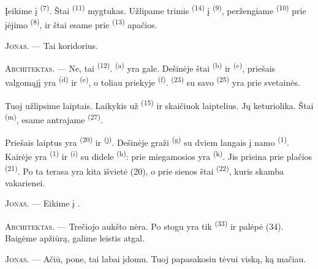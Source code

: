 Įeikime į  \textsuperscript{(7)}. Štai 
\textsuperscript{(11)} mygtukas. Užlipame trimis 
\textsuperscript{(14)} į  \textsuperscript{(9)}, peržengiame
 \textsuperscript{(10)} prie įėjimo 
\textsuperscript{(8)}, ir štai esame prie  \textsuperscript{(13)}
apačios.

\textsc{Jonas}. --- Tai koridorius.

\textsc{Architektas}. --- Ne, tai  \textsuperscript{(12)}.
 \textsuperscript{(a)} yra gale. Dešinėje štai 
\textsuperscript{(b)} ir  \textsuperscript{(c)}, priešais
valgomąjį yra  \textsuperscript{(d)} ir 
\textsuperscript{(e)}, o toliau priekyje 
\textsuperscript{(f)}.  \textsuperscript{(23)} su savo
 \textsuperscript{(25)} yra prie svetainės.

Tuoj užlipsime laiptais. Laikykis už  \textsuperscript{(15)} ir
skaičiuok laiptelius. Jų keturiolika. Štai 
\textsuperscript{(m)}, esame antrajame  \textsuperscript{(27)}.

\VUsaut{3.0mm}
\VUsaut{3.0mm}

Priešais laiptus yra  \textsuperscript{(20)} ir 
\textsuperscript{(j)}. Dešinėje graži  \textsuperscript{(g)} su
dviem langais į namo  \textsuperscript{(1)}. Kairėje yra
 \textsuperscript{(1)} ir 
\textsuperscript{(i)} su didele  \textsuperscript{(h)}: prie
miegamosios yra  \textsuperscript{(k)}. Jis prieina prie
plačios  \textsuperscript{(21)}. Po ta terasa yra kita išvietė (20),
o prie sienos štai  \textsuperscript{(22)}, kuris skamba vakarienei.

\textsc{Jonas}. --- Eikime į .

\textsc{Architektas}. --- Trečiojo aukšto nėra. Po stogu yra tik
 \textsuperscript{(33)} ir palėpė (34). Baigėme apžiūrą, galime
leistis atgal.

\textsc{Jonas}. --- Ačiū, pone, tai labai įdomu. Tuoj papasakosiu tėvui viską, ką
mačiau.

\VUsaut{4.0mm}
\VUfilet{22mm}
